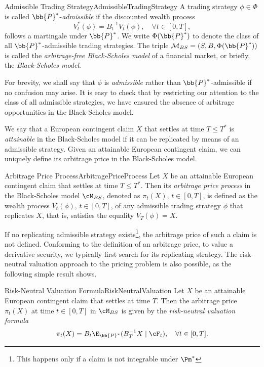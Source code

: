 \begin{defn}{Admissible Trading Strategy}{AdmissibleTradingStrategy}
	A trading strategy $\phi \in \Phi$ is called $\bb{P}^*$-\textit{admissible} if the discounted wealth process
	\[
		V_t^*(\phi) = B_t^{-1} V_t(\phi), \quad \forall t \in [0, T],
	\]
	follows a martingale under $\bb{P}^*$. We write $\Phi(\bb{P}^*)$ to denote the class of all $\bb{P}^*$-admissible trading strategies. The triple $\mathcal{M}_{BS} = (S, B, \Phi(\bb{P}^*))$ is called the \textit{arbitrage-free Black-Scholes model} of a financial market, or briefly, the \textit{Black-Scholes model}.
\end{defn}

For brevity, we shall say that $\phi$ is \textit{admissible} rather than $\bb{P}^*$-admissible if no confusion may arise. It is easy to check that by restricting our attention to the class of all admissible strategies, we have ensured the absence of arbitrage opportunities in the Black-Scholes model.

We say that a European contingent claim $X$ that settles at time $T \leq T^*$ is \textit{attainable} in the Black-Scholes model if it can be replicated by means of an admissible strategy. Given an attainable European contingent claim, we can uniquely define its arbitrage price in the Black-Scholes model.

\begin{defn}{Arbitrage Price Process}{ArbitragePriceProcess}
	Let $X$ be an attainable European contingent claim that settles at time $T \leq T^*$. Then its \textit{arbitrage price process} in the Black-Scholes model $\cM_{BS}$, denoted as $\pi_t(X)$, $t \in [0, T]$, is defined as the wealth process $V_t(\phi)$, $t \in [0, T]$, of any admissible trading strategy $\phi$ that replicates $X$, that is, satisfies the equality $V_T(\phi) = X$.
\end{defn}

If no replicating admissible strategy exists\footnote{This happens only if a claim is not integrable under $\Pm^*$}, the arbitrage price of such a claim is not defined. Conforming to the definition of an arbitrage price, to value a derivative security, we typically first search for its replicating strategy. The risk-neutral valuation approach to the pricing problem is also possible, as the following simple result shows.

\begin{cor}{Risk-Neutral Valuation Formula}{RiskNeutralValuation}
	Let $X$ be an attainable European contingent claim that settles at time $T$. Then the arbitrage price $\pi_t(X)$ at time $t \in [0, T]$ in $\cM_{BS}$ is given by the \textit{risk-neutral valuation formula}
	\begin{equation}
		\pi_t(X) = B_t \E_{\bb{P}^*}(B_T^{-1} X \mid \cF_t), \quad \forall t \in [0, T].
	\end{equation}
\end{cor}



